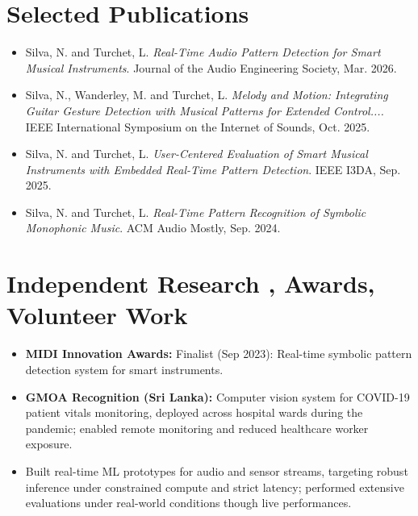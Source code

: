 \documentclass[11pt]{article}
\begin{document}
\section*{Selected Publications \footnotesize {}}
\begin{itemize}[leftmargin=1.2em, itemsep=-0.25em]
    \item Silva, N. and Turchet, L. \textit{Real-Time Audio Pattern Detection for Smart Musical Instruments}. Journal of the Audio Engineering Society, Mar. 2026.
    \item Silva, N., Wanderley, M. and Turchet, L. \textit{Melody and Motion: Integrating Guitar Gesture Detection with Musical Patterns for Extended Control....} IEEE International Symposium on the Internet of Sounds, Oct. 2025.
    \item Silva, N. and Turchet, L. \textit{User-Centered Evaluation of Smart Musical Instruments with Embedded Real-Time Pattern Detection}. IEEE I3DA, Sep. 2025.
    \item Silva, N. and Turchet, L. \textit{Real-Time Pattern Recognition of Symbolic Monophonic Music}. ACM Audio Mostly, Sep. 2024.
\end{itemize}

\section*{Independent Research , Awards, Volunteer Work}
\begin{itemize}[leftmargin=1.2em, itemsep=-0.25em]
    \item \textbf{MIDI Innovation Awards:} Finalist (Sep 2023): Real-time symbolic pattern detection system for smart instruments.
    \item \textbf{GMOA Recognition (Sri Lanka):} Computer vision system for COVID-19 patient vitals monitoring, deployed across hospital wards during the pandemic; enabled remote monitoring and reduced healthcare worker exposure.
    \item Built real-time ML prototypes for audio and sensor streams, targeting robust inference under constrained compute and strict latency; performed extensive evaluations under real-world conditions though live performances.
\end{itemize}
\end{document}
